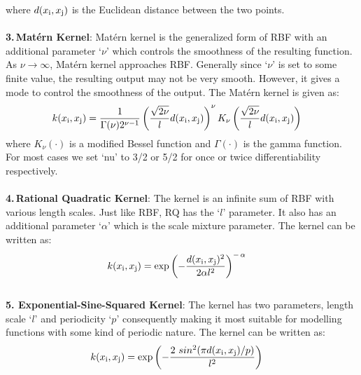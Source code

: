         where $d(x_{\rm i}, x_{\rm j})$ is the Euclidean distance between the two points.\\
        \\
        \textbf{3.\,Mat\'ern Kernel}: Mat\'ern kernel is the generalized form of RBF with an
        additional parameter `$\nu$' which controls the smoothness of the resulting function. As
        $\nu \rightarrow \infty$, Mat\'ern kernel approaches RBF. Generally since `$\nu$' is set to
        some finite value, the resulting output may not be very smooth. However, it gives a mode to
        control the smoothness of the output. The Mat\'ern kernel is given as:
        \begin{align}
            \begin{split}
                k(x_{\rm i}, x_{\rm j}) & = \frac{1}{\Gamma(\nu)2^{\nu-1}}\left(\frac{\sqrt{2\nu}}{l} d(x_{\rm i} , x_{\rm j})\right)^\nu K_\nu\left(\frac{\sqrt{2\nu}}{l} d(x_{\rm i} , x_{\rm j} )\right) \label{eq:mat_ker}
            \end{split}
        \end{align}
        where $K_{\nu}(\cdot)$ is a modified Bessel function and $\Gamma(\cdot)$ is the gamma
        function. For most cases we set `nu' to 3/2 or 5/2 for once or twice differentiability
        respectively.\\
        \\
        \textbf{4.\,Rational Quadratic Kernel}: The kernel is an infinite sum of RBF with various
        length scales. Just like RBF, RQ has the `$l$' parameter. It also has an additional
        parameter `$\alpha$' which is the scale mixture parameter. The kernel can be written as:
        \begin{align}
            \begin{split}
                k(x_{\rm i}, x_{\rm j}) & = \exp\left(- \frac{d(x_{\rm i}, x_{\rm j})^2}{2\alpha l^2} \right)^{-\,\alpha} \label{eq:raq_ker}
            \end{split}
        \end{align}
        \\
        \textbf{5. Exponential-Sine-Squared Kernel}: The kernel has two parameters, length scale
        `$l$' and periodicity `$p$' consequently making it most suitable for modelling functions
        with some kind of periodic nature. The kernel can be written as:
        \begin{align}
            \begin{split}
                k(x_{\rm i}, x_{\rm j}) & = \exp\left(- \frac{2~sin^2(\pi d(x_{\rm i},x_{\rm j})/p)}{l^2} \right) \label{eq:ess_ker}
            \end{split}
        \end{align}

